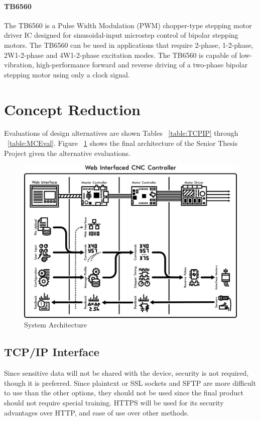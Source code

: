 \paragraph{TB6560}
The TB6560 is a Pulse Width Modulation (PWM) chopper-type stepping motor driver IC designed for sinusoidal-input microstep control of bipolar stepping motors.
The TB6560 can be used in applications that require 2-phase, 1-2-phase, 2W1-2-phase and 4W1-2-phase excitation modes.
The TB6560 is capable of low-vibration, high-performance forward and reverse driving of a two-phase bipolar stepping motor using only a clock signal.

\section{Concept Reduction}
Evaluations of design alternatives are shown Tables ~\ref{table:TCPIP} through ~\ref{table:MCEval}.
Figure ~\ref{fig:architecture} shows the final architecture of the Senior Thesis Project given the alternative evaluations.

\begin{figure}[h]
	\centering
	\includegraphics[width=1\textwidth]{architecture.png}
	\caption{System Architecture}
	\label{fig:architecture}
\end{figure} 

\subsection{TCP/IP Interface}
Since sensitive data will not be shared with the device, security is not required, though it is preferred. 
Since plaintext or SSL sockets and SFTP are more difficult to use than the other options, they should not be used since the final product should not require special training. 
HTTPS will be used for its security advantages over HTTP, and ease of use over other methods. 

